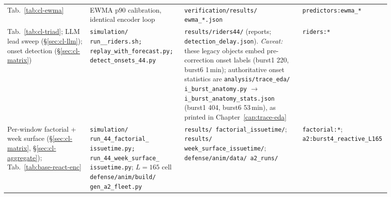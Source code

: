 {\begin{longtable}{@{}>{\raggedright\arraybackslash}p{0.215\linewidth}>{\raggedright\arraybackslash}p{0.245\linewidth}>{\raggedright\arraybackslash}p{0.30\linewidth}>{\raggedright\arraybackslash}p{0.155\linewidth}@{}}
Tab.~\ref{tab:cl-ewma} & EWMA p90 calibration, identical encoder loop &
  \texttt{verification/results/ ewma\_*.json} &
  \texttt{predictors:\allowbreak ewma\_*} \\
Tab.~\ref{tab:cl-triad}; LLM lead sweep (\S\ref{sec:cl-llm}); onset
  detection (\S\ref{sec:cl-matrix}) &
  \texttt{simulation/ run\_\allowbreak 44\_\allowbreak riders.sh;
  replay\_\allowbreak with\_\allowbreak forecast.py;
  detect\_\allowbreak onsets\_\allowbreak 44.py} &
  \texttt{results/riders44/} (reports; \texttt{detection\_delay.json}).
  \emph{Caveat:} these legacy objects embed pre-correction onset labels
  (burst1 220, burst6 1\,min); authoritative onset statistics are
  \texttt{analysis/trace\_eda/ i\_burst\_anatomy.py} $\to$
  \texttt{i\_burst\_anatomy\_stats.json} (burst1 404, burst6 53\,min),
  as printed in Chapter~\ref{cap:trace-eda} &
  \texttt{riders:*} \\
Per-window factorial + week surface (\S\ref{sec:cl-matrix},
  \S\ref{sec:cl-aggregate}); Tab.~\ref{tab:base-react-enc} &
  \texttt{simulation/ run\_44\_factorial\_ issuetime.py;
  run\_44\_week\_surface\_ issuetime.py}; $L{=}165$ cell
  \texttt{defense/anim/build/ gen\_a2\_fleet.py} &
  \texttt{results/ factorial\_issuetime/}; \texttt{results/
  week\_surface\_issuetime/}; \texttt{defense/anim/data/ a2\_runs/} &
  \texttt{factorial:*}; \texttt{a2:burst4\_\allowbreak reactive\_L165} \\


\end{longtable}}
